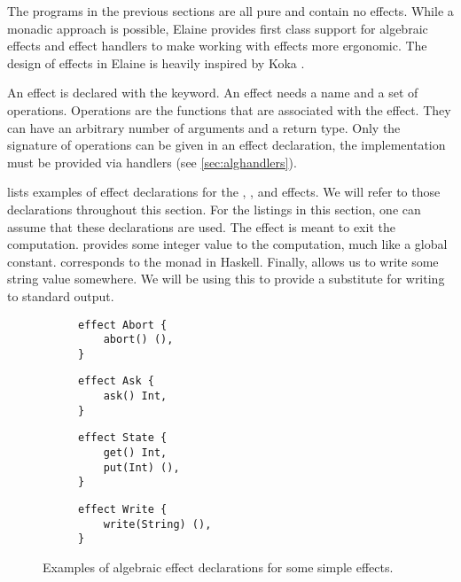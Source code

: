 The programs in the previous sections are all pure and contain no effects. While a monadic approach is possible, Elaine provides first class support for algebraic effects and effect handlers to make working with effects more ergonomic. The design of effects in Elaine is heavily inspired by Koka \citationneeded.

An effect is declared with the  keyword. An effect needs a name and a set of operations. Operations are the functions that are associated with the effect. They can have an arbitrary number of arguments and a return type. Only the signature of operations can be given in an effect declaration, the implementation must be provided via handlers (see \cref{sec:alghandlers}).

 lists examples of effect declarations for the , ,  and  effects. We will refer to those declarations throughout this section. For the listings in this section, one can assume that these declarations are used. The  effect is meant to exit the computation.  provides some integer value to the computation, much like a global constant.  corresponds to the  monad in Haskell. Finally,  allows us to write some string value somewhere. We will be using this to provide a substitute for writing to standard output.

\begin{figure}[htbp]
    \begin{subfigure}{0.5\textwidth}
        \begin{lstlisting}[style=fancy]
effect Abort {
    abort() (),
}
        \end{lstlisting}
    \end{subfigure}
    \begin{subfigure}{0.5\textwidth}
        \begin{lstlisting}[style=fancy]
effect Ask {
    ask() Int,
}
        \end{lstlisting}
    \end{subfigure}
    \begin{subfigure}{0.5\textwidth}
        \begin{lstlisting}[style=fancy]
effect State {
    get() Int,
    put(Int) (),
}
        \end{lstlisting}
    \end{subfigure}
    \begin{subfigure}{0.5\textwidth}
        \begin{lstlisting}[style=fancy]
effect Write {
    write(String) (),
}
        \end{lstlisting}
    \end{subfigure}
    \caption{Examples of algebraic effect declarations for some simple effects.}
    \label{fig:effect_decls}
\end{figure}

